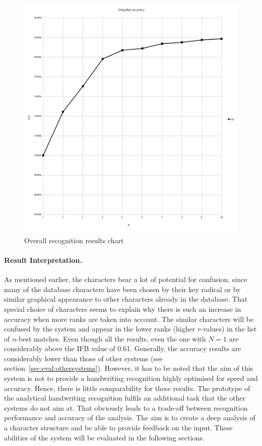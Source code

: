 \begin{figure}[htbp]
  \begin{center}
    \includegraphics[scale=0.5]{images/weightedAccuracyOverall.png}
    \caption{Overall recognition results chart}
    \label{fig:eval:overallrecognitionresults}
  \end{center}
\end{figure}

\paragraph{Result Interpretation.}
As mentioned earlier, the characters bear a lot of potential for confusion,
since many of the database characters have been chosen by their key radical
or by similar graphical appearance to other characters already in the database.
That special choice of characters seems to explain why there is such an
increase in accuracy when more ranks are taken into account.
The similar characters will be confused by the system and appear in
the lower ranks (higher \(r\)-values) in the list of \(n\)-best matches.
Even though all the results, even the one with \(N = 1\) are considerably above
the IFB value of 0.61.
Generally, the accuracy results are considerably lower than those of other
systems (see section~\ref{sec:eval:othersystems}). 
However, it has to be noted that the aim of this system is not 
to provide a handwriting recognition highly optimised for speed and accuracy.
Hence, there is little comparability for these results. 
The prototype of the analytical handwriting recognition fulfils an additional 
task that the other systems do not aim at. That obviously leads to a trade-off
between recognition performance and accuracy of the analysis.
The aim is to create a deep analysis of a character structure and
be able to provide feedback on the input. These abilities of the system will
be evaluated in the following sections.

